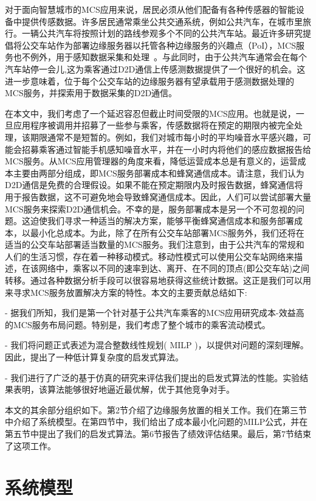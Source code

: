 对于面向智慧城市的MCS应用来说，居民必须从他们配备有各种传感器的智能设备中提供传感数据。许多居民通常乘坐公共交通系统，例如公共汽车，在城市里旅行。一辆公共汽车将按照计划的路线参观多个不同的公共汽车站。最近许多研究提倡将公交车站作为部署边缘服务器以托管各种边缘服务的兴趣点（PoI），MCS服务也不例外，用于感知数据采集和处理~\cite{DBLP:journals/iotj/ZhanXZW18}。与此同时，由于公共汽车通常会在每个汽车站停一会儿,这为乘客通过D2D通信上传感测数据提供了一个很好的机会。这进一步意味着，位于每个公交车站的边缘服务器有望承载用于感测数据处理的MCS服务，并探索用于数据采集的D2D通信。


在本文中，我们考虑了一个延迟容忍但截止时间受限的MCS应用。也就是说，一旦应用程序被调用并招募了一些参与乘客，传感数据将在预定的期限内被完全处理，该期限通常不是短暂的。例如，我们对城市每小时的平均噪音水平感兴趣，可能会招募乘客通过智能手机感知噪音水平，并在一小时内将他们的感应数据报告给MCS服务。从MCS应用管理器的角度来看，降低运营成本总是有意义的，运营成本主要由两部分组成，即MCS服务部署成本和蜂窝通信成本。请注意，我们认为D2D通信是免费的合理假设。如果不能在预定期限内及时报告数据，蜂窝通信将用于报告数据，这不可避免地会导致蜂窝通信成本。因此，人们可以尝试部署大量MCS服务来探索D2D通信机会。不幸的是，服务部署成本是另一个不可忽视的问题。这迫使我们寻求一种适当的解决方案，能够平衡蜂窝通信成本和服务部署成本，以最小化总成本。为此，除了在所有公交车站部署MCS服务外，我们还将在适当的公交车站部署适当数量的MCS服务。我们注意到，由于公共汽车的常规和人们的生活习惯，存在着一种移动模式。移动性模式可以使用公交车站网络来描述，在该网络中，乘客以不同的速率到达、离开、在不同的顶点(即公交车站)之间转移。通过各种数据分析手段可以很容易地获得这些统计数据。这正是我们可以用来寻求MCS服务放置解决方案的特性。本文的主要贡献总结如下:

- 据我们所知，我们是第一个针对基于公共汽车乘客的MCS应用研究成本-效益高的MCS服务布局问题。特别是，我们考虑了整个城市的乘客流动模式。

- 我们将问题正式表述为混合整数线性规划( MILP )，以提供对问题的深刻理解。因此，提出了一种低计算复杂度的启发式算法。

- 我们进行了广泛的基于仿真的研究来评估我们提出的启发式算法的性能。实验结果表明，该算法能够很好地逼近最优解，优于其他竞争对手。

本文的其余部分组织如下。第2节介绍了边缘服务放置的相关工作。我们在第三节中介绍了系统模型。在第四节中，我们给出了成本最小化问题的MILP公式，并在第五节中提出了我们的启发式算法。第6节报告了绩效评估结果。最后，第7节结束了这项工作。


\section{系统模型}

